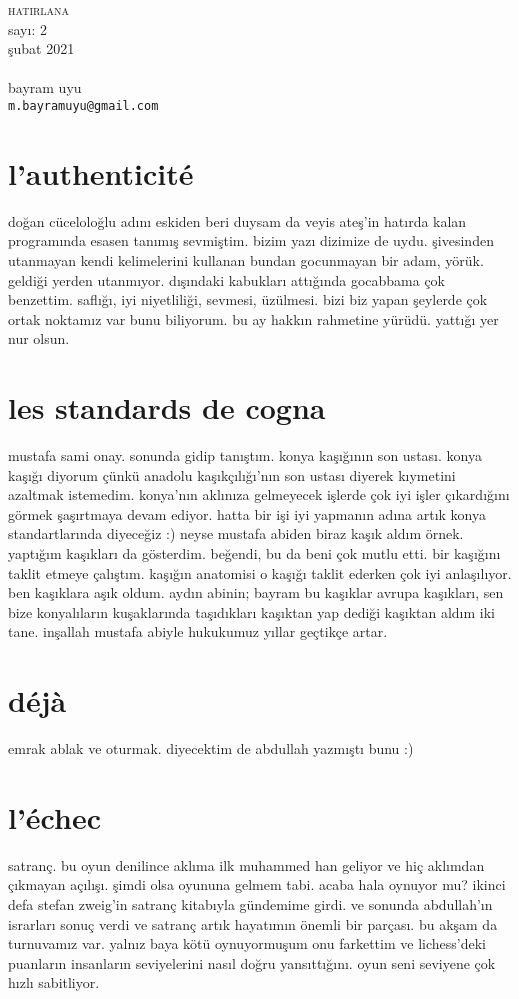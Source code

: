 \documentclass[9pt, a5paper, twocolumn, openright]{memoir}
\begin{document}
\thispagestyle{plain}
\noindent
{\HUGE\textsc{hatirlana}\\\small{}sayı: 2\\şubat 2021}\\\\
{\small{}bayram uyu\\\texttt{m.bayramuyu@gmail.com}}
\bigskip
\section{l'authenticité}
doğan cüceloloğlu adını eskiden beri duysam da veyis ateş’in hatırda
kalan programında esasen tanımış sevmiştim. bizim yazı dizimize de uydu.
şivesinden utanmayan kendi kelimelerini kullanan bundan gocunmayan bir
adam, yörük. geldiği yerden utanmıyor. dışındaki kabukları attığında
gocabbama çok benzettim. saflığı, iyi niyetliliği, sevmesi, üzülmesi.
bizi biz yapan şeylerde çok ortak noktamız var bunu biliyorum. bu ay
hakkın rahmetine yürüdü. yattığı yer nur olsun.
\section{les standards de cogna}
mustafa sami onay. sonunda gidip tanıştım. konya kaşığının son ustası.
konya kaşığı diyorum çünkü anadolu kaşıkçılığı’nın son ustası diyerek
kıymetini azaltmak istemedim. konya’nın aklınıza gelmeyecek işlerde çok
iyi işler çıkardığını görmek şaşırtmaya devam ediyor. hatta bir işi iyi
yapmanın adına artık konya standartlarında diyeceğiz :) neyse mustafa
abiden biraz kaşık aldım örnek. yaptığım kaşıkları da gösterdim. beğendi,
bu da beni çok mutlu etti. bir kaşığını taklit etmeye çalıştım. kaşığın
anatomisi o kaşığı taklit ederken çok iyi anlaşılıyor. ben kaşıklara aşık
oldum. aydın abinin; bayram bu kaşıklar avrupa kaşıkları, sen bize
konyalıların kuşaklarında taşıdıkları kaşıktan yap dediği kaşıktan aldım
iki tane. inşallah mustafa abiyle hukukumuz yıllar geçtikçe artar.
\section{déjà}
emrak ablak ve oturmak. diyecektim de abdullah yazmıştı bunu :)
\section{l'échec}
satranç. bu oyun denilince aklıma ilk muhammed han geliyor ve hiç
aklımdan çıkmayan açılışı. şimdi olsa oyununa gelmem tabi. acaba hala
oynuyor mu? ikinci defa stefan zweig’in satranç kitabıyla gündemime
girdi. ve sonunda abdullah’ın israrları sonuç verdi ve satranç artık
hayatımın önemli bir parçası. bu akşam da turnuvamız var. yalnız baya
kötü oynuyormuşum onu farkettim ve lichess’deki puanların insanların
seviyelerini nasıl doğru yansıttığını. oyun seni seviyene çok hızlı
sabitliyor.
\end{document}
